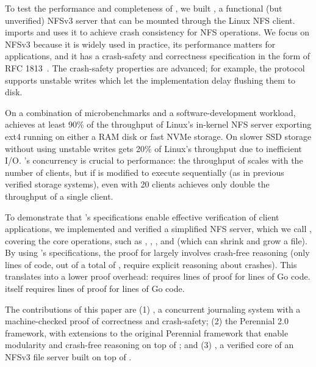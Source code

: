 
To test the performance and completeness of \txn, we built \gnfs, a functional
(but unverified) NFSv3
server that can be mounted through the Linux NFS client. \gnfs imports \txn
and uses it to achieve crash consistency for NFS operations. We focus on
NFSv3 because it is widely used in practice, its performance matters
for applications, and it has a crash-safety and correctness
specification in the form of RFC 1813~\cite{RFC:1813}.  The
crash-safety properties are advanced; for example, the protocol supports unstable
writes which let the implementation delay flushing them to disk.

On a combination of microbenchmarks and a software-development workload,
\gnfs achieves at least 90\% of the throughput of Linux's in-kernel NFS server
exporting ext4 running on either a RAM disk or fast NVMe storage. On slower
SSD storage without using unstable writes \gnfs gets 20\% of Linux's throughput
due to inefficient I/O. \txn's
concurrency is crucial to performance: the throughput of \gnfs scales
with the number of clients, but if \txn is modified to execute
sequentially (as in previous verified storage systems), even with 20 clients \gnfs achieves only
double the throughput of a single client.

To demonstrate that \txn's specifications enable effective verification of client applications,
we implemented and verified a simplified NFS server, which we call \simplenfs,
covering the core operations, such as , ,
, and  (which can shrink and grow a file).
By using \txn's specifications, the proof for \simplenfs largely involves crash-free reasoning
(only \simplenfsCrashLOC{} lines of code, out of a total of \simplenfsLOC{}, require explicit reasoning about crashes).
This translates into a lower proof overhead: \simplenfs requires \simplenfsLOP{}
lines of proof for \simplenfsLOC{} lines of Go code.  \txn itself requires
\gotxnLOP{} lines of proof for \gotxnLOC{} lines of Go code.

The contributions of this paper are (1) \txn, a concurrent
journaling system with a machine-checked proof of correctness and
crash-safety; (2) the Perennial 2.0 framework, with extensions to the original
Perennial framework that enable modularity and crash-free reasoning on top of \txn;
and (3) \simplenfs, a verified core of an NFSv3 file server built on
top of \txn.

